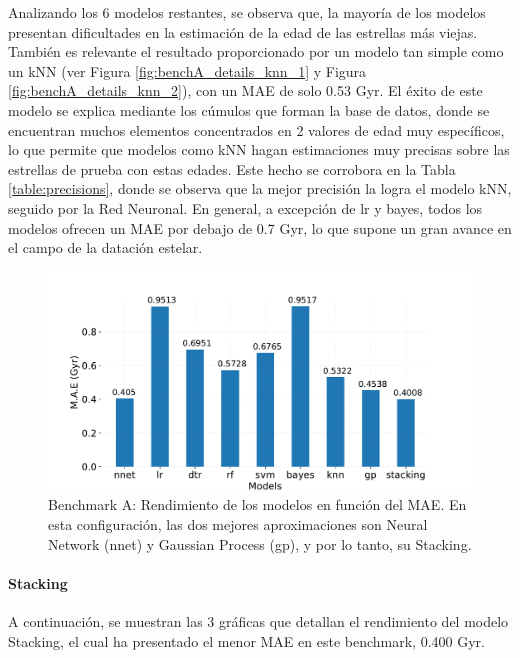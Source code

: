 Analizando los 6 modelos restantes, se observa que, la mayoría de los modelos presentan dificultades en la estimación de la edad de las estrellas más viejas. También es relevante el resultado proporcionado por un modelo tan simple como un kNN (ver Figura \ref{fig:benchA_details_knn_1} y Figura \ref{fig:benchA_details_knn_2}), con un MAE de solo 0.53 Gyr. El éxito de este modelo se explica mediante los cúmulos que forman la base de datos, donde se encuentran muchos elementos concentrados en 2 valores de edad muy específicos, lo que permite que modelos como kNN hagan estimaciones muy precisas sobre las estrellas de prueba con estas edades. Este hecho se corrobora en la Tabla \ref{table:precisions}, donde se observa que la mejor precisión la logra el modelo kNN, seguido por la Red Neuronal. En general, a excepción de lr y bayes, todos los modelos ofrecen un MAE por debajo de 0.7 Gyr, lo que supone un gran avance en el campo de la datación estelar.

\begin{figure}[H]
\begin{center}
 \includegraphics[width=0.8\linewidth]{Figuras/Experimentos/B_A_models.pdf}
\end{center}
\caption{Benchmark A: Rendimiento de los modelos en función del MAE. En esta configuración, las dos mejores aproximaciones son Neural Network (nnet) y Gaussian Process (gp), y por lo tanto, su Stacking.}
 \label{fig:benchA_models}
\end{figure}

\paragraph{Stacking} 
A continuación, se muestran las 3 gráficas que detallan el rendimiento del modelo Stacking, el cual ha presentado el menor MAE en este benchmark, 0.400 Gyr.

